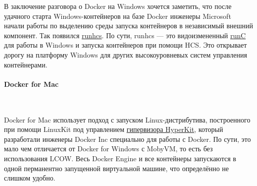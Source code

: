 \documentclass[14pt, a4paper]{article}
\begin{document}
\begin{figure}[H]
    \centering
    \label{3.7}
\end{figure}

В заключение разговора о Docker на Windows хочется заметить, что после удачного старта
Windows-контейнеров на базе Docker инженеры Microsoft начали работы по выделению среды запуска
контейнеров в независимый внешний компонент. Так появился \href{https://docs.microsoft.com/en-us/virtualization/windowscontainers/deploy-containers/containerd#runhcs}{runhcs}. По сути, runhcs — это
видоизмененный \href{https://github.com/microsoft/hcsshim/tree/master/cmd/runhcs}{runC} для работы в Windows и запуска контейнеров при помощи HCS. Это открывает
дорогу на платформу Windows для других высокоуровневых систем управления контейнерами.\\

\paragraph*{Docker for Mac} \mbox{}\\

Docker for Mac использует подход с запуском Linux-дистрибутива, построенного при помощи LinuxKit
под управлением \href{https://github.com/moby/hyperkit}{гипервизора HyperKit}, который разработали инженеры Docker Inc специально для
работы с Docker. По сути, это мало чем отличается от Docker for Windows с MobyVM, то есть без
использования LCOW. Весь Docker Engine и все контейнеры запускаются в одной перманентно
запущенной виртуальной машине, что определённо не слишком удобно.
\end{document}
